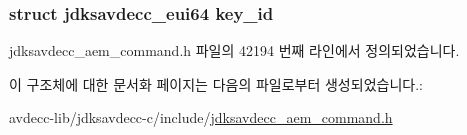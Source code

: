 \subsubsection[{\texorpdfstring{key\+\_\+id}{key_id}}]{\setlength{\rightskip}{0pt plus 5cm}struct {\bf jdksavdecc\+\_\+eui64} key\+\_\+id}\hypertarget{structjdksavdecc__aem__command__enable__stream__encryption__response_a37cbdf6056556ccfaee3ab01dc7c3032}{}\label{structjdksavdecc__aem__command__enable__stream__encryption__response_a37cbdf6056556ccfaee3ab01dc7c3032}


jdksavdecc\+\_\+aem\+\_\+command.\+h 파일의 42194 번째 라인에서 정의되었습니다.



이 구조체에 대한 문서화 페이지는 다음의 파일로부터 생성되었습니다.\+:\begin{DoxyCompactItemize}
\item 
avdecc-\/lib/jdksavdecc-\/c/include/\hyperlink{jdksavdecc__aem__command_8h}{jdksavdecc\+\_\+aem\+\_\+command.\+h}\end{DoxyCompactItemize}
